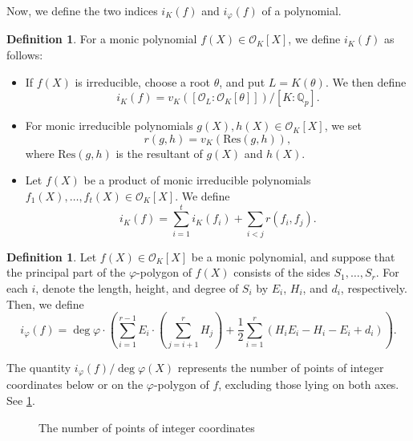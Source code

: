 \documentclass{article}
\newcommand{\field}[1]{\mathbb{#1}}
\newcommand{\Q}{\field{Q}}
\theoremstyle{definition}
\newtheorem{definition}[theorem]{Definition}
\theoremstyle{remark}
\numberwithin{equation}{section}
\begin{document}
    Now, we define the two indices $i_K(f)$ and $i_\varphi(f)$ of a polynomial. 

    \begin{definition}\label{def:index of K}
      For a monic polynomial $f(X) \in \mathcal{O}_K[X]$, we define $i_K(f)$ as follows: 
      \begin{itemize}
        \item If $f(X)$ is irreducible, choose a root $\theta$, and put $L=K(\theta)$. 
          We then define 
          \[
            i_K(f) = v_K([\mathcal{O}_L:\mathcal{O}_K[\theta]])/[K:\Q_p]. 
          \]
        \item For monic irreducible polynomials $g(X),h(X) \in \mathcal{O}_K[X]$, 
          we set 
          \[
             r(g,h) = v_K(\mathrm{Res}(g,h)), 
          \]
          where $\mathrm{Res}(g,h)$ is the resultant of $g(X)$ and $h(X)$. 
        \item Let $f(X)$ be a product of monic irreducible polynomials $f_1(X), \dots ,f_t(X) \in \mathcal{O}_K[X]$. 
          We define 
          \[
            i_K(f) = \sum_{i = 1}^t i_K(f_i) + \sum_{i<j} r(f_i,f_j). 
          \]
      \end{itemize}
    \end{definition}

    \begin{definition}\label{def:index of phi}
      Let $f(X) \in \mathcal{O}_K[X]$ be a monic polynomial, and suppose that the principal part 
      of the $\varphi$-polygon of $f(X)$ consists of the sides $S_1, \dots ,S_r$. 
      For each $i$, denote the length, height, and degree of $S_{i}$ by $E_i$, $H_i$, and $d_i$, respectively. 
      Then, we define 
      \[
        i_{\varphi}(f) = \deg\varphi\cdot\left(\sum_{i = 1}^{r - 1} E_i \cdot 
        \left(\sum_{j = i + 1}^r H_j\right) + \frac{1}{2} \sum_{i = 1}^r 
        (H_i E_i - H_i - E_i + d_i)\right).
      \]
    \end{definition}

    The quantity $i_{\varphi}(f)/\deg\varphi(X)$ represents the number of points of 
    integer coordinates below or on the $\varphi$-polygon of $f$, excluding those lying on both axes. 
    See \cref{fig:1}.

    \begin{figure}
      \centering
      \caption{The number of points of integer coordinates}
      \label{fig:1}
    \end{figure}
\end{document}
